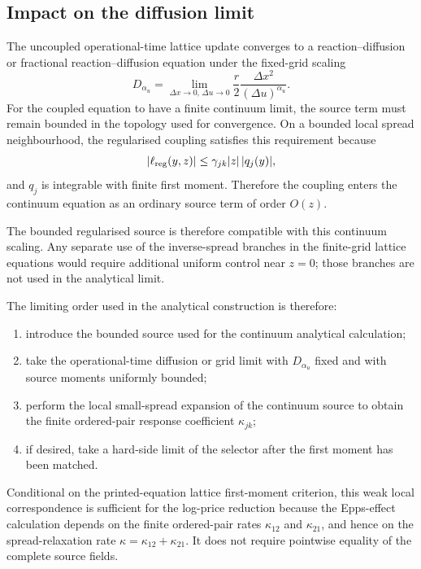 \documentclass[5p,final]{elsarticle}
\begin{document}
\subsection{Impact on the diffusion limit}

The uncoupled operational-time lattice update converges to a reaction--diffusion or fractional reaction--diffusion equation under the fixed-grid scaling
\begin{equation}
D_{\alpha_u}=\lim_{\Delta x\to0,\,\Delta u\to0}
\frac{r}{2}\frac{\Delta x^2}{(\Delta u)^{\alpha_u}}.
\end{equation}
For the coupled equation to have a finite continuum limit, the source term must remain bounded in the topology used for convergence. On a bounded local spread neighbourhood, the regularised coupling satisfies this requirement because
\begin{equation}
|\ell_{\rm reg}(y,z)|
\leq \gamma_{jk}|z|\,|q_j(y)|,
\end{equation}
and $q_j$ is integrable with finite first moment.  Therefore the coupling enters the continuum equation as an ordinary source term of order $O(z)$.

The bounded regularised source is therefore compatible with this continuum scaling. Any separate use of the inverse-spread branches in the finite-grid lattice equations would require additional uniform control near $z=0$; those branches are not used in the analytical limit.

The limiting order used in the analytical construction is therefore:
\begin{enumerate}
\item introduce the bounded source used for the continuum analytical calculation;
\item take the operational-time diffusion or grid limit with $D_{\alpha_u}$ fixed and with source moments uniformly bounded;
\item perform the local small-spread expansion of the continuum source to obtain the finite ordered-pair response coefficient $\kappa_{jk}$;
\item if desired, take a hard-side limit of the selector after the first moment has been matched.
\end{enumerate}

Conditional on the printed-equation lattice first-moment criterion, this weak local correspondence is sufficient for the log-price reduction because the Epps-effect calculation depends on the finite ordered-pair rates $\kappa_{12}$ and $\kappa_{21}$, and hence on the spread-relaxation rate $\kappa=\kappa_{12}+\kappa_{21}$. It does not require pointwise equality of the complete source fields.
\end{document}
